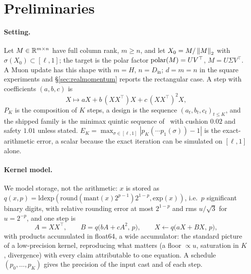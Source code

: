\section{Preliminaries}
\label{sec:prelim}

\paragraph{Setting.}
Let $M \in \mathbb{R}^{m\times n}$ have full column rank, $m\ge n$, and let
$X_0 = M/\left\lVert M \right\rVert_2$ with $\sigma(X_0) \subset [\ell,1]$; the target is the polar factor
$\operatorname{polar}(M) = UV^\top$, $M = U\Sigma V^\top$.  A Muon update has this shape with $m = H$,
$n = D_{\mathrm{in}}$; $d=m=n$ in the square experiments and \S\ref{sec:realmomentum}
reports the rectangular case.  A step with coefficients $(a,b,c)$ is
\begin{equation}
X \mapsto aX + b\,(XX^\top)X + c\,(XX^\top)^2 X ,
\label{eq:step}
\end{equation}
$P_K$ is the composition of $K$ steps, a design is the sequence $(a_t,b_t,c_t)_{t\le K}$,
and the shipped family is the minimax quintic sequence of~\cite{amsel2025polar} with
cushion $0.02$ and safety $1.01$ unless stated.
$E_K = \max_{\sigma\in[\ell,1]}|p_K(\cdots p_1(\sigma)) - 1|$ is the exact-arithmetic
error, a scalar because the exact iteration can be simulated on $[\ell,1]$ alone.

\paragraph{Kernel model.}
We model storage, not the arithmetic: $x$ is stored as
$q(x,p) = \mathrm{ldexp}(\mathrm{round}(\mathrm{mant}(x)2^{p-1})2^{1-p},\allowbreak
\mathrm{exp}(x))$, i.e.\ $p$ significant binary digits, with relative rounding error at
most $2^{1-p}$ and rms $u/\sqrt3$ for $u = 2^{-p}$, and one step is
\begin{equation}
A = XX^\top, \qquad B = q\bigl(bA + cA^2,\, p\bigr), \qquad
X \leftarrow q\bigl(aX + BX,\, p\bigr),
\label{eq:kernel}
\end{equation}
with products accumulated in float64, a wide accumulator: the standard picture of a
low-precision kernel, reproducing what matters (a floor $\propto u$, saturation in $K$,
divergence) with every claim attributable to one equation.  A schedule $(p_0,\dots,p_K)$
gives the precision of the input cast and of each step.


